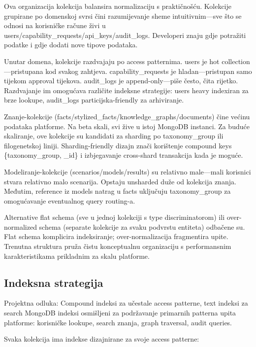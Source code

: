 \documentclass[12pt,a4paper]{article}
\begin{document}
Ova organizacija kolekcija balansira normalizaciju s praktičnošću. Kolekcije grupirane po domenskoj svrsi čini razumijevanje sheme intuitivnim—sve što se odnosi na korisničke račune živi u users/capability\_requests/api\_keys/audit\_logs. Developeri znaju gdje potražiti podatke i gdje dodati nove tipove podataka.

Unutar domena, kolekcije razdvajaju po access patternima. users je hot collection—pristupana kod svakog zahtjeva. capability\_requests je hladan—pristupan samo tijekom approval tijekova. audit\_logs je append-only—piše često, čita rijetko. Razdvajanje im omogućava različite indeksne strategije: users heavy indexiran za brze lookupe, audit\_logs particijska-friendly za arhiviranje.

Znanje-kolekcije (facts/stylized\_facts/knowledge\_graphs/documents) čine većinu podataka platforme. Na beta skali, svi žive u istoj MongoDB instanci. Za buduće skaliranje, ove kolekcije su kandidati za sharding po taxonomy\_group ili filogenetskoj liniji. Sharding-friendly dizajn znači korištenje compound keys \{taxonomy\_group, \_id\} i izbjegavanje cross-shard transakcija kada je moguće.

Modeliranje-kolekcije (scenarios/models/results) su relativno male—mali korisnici stvara relativno malo scenarija. Opstaju unsharded duže od kolekcija znanja. Međutim, reference iz models natrag u facts uključuju taxonomy\_group za omogućavanje eventualnog query routing-a.

Alternative flat schema (sve u jednoj kolekciji s type discriminatorom) ili over-normalized schema (separate kolekcije za svaku podvrstu entiteta) odbačene su. Flat schema komplicira indeksiranje; over-normalizacija fragmentira upite. Trenutna struktura pruža čistu konceptualnu organizaciju s performansnim karakteristikama prikladnim za skalu platforme.

\subsection{Indeksna strategija}

\begin{rationale}{Projektna odluka: Compound indeksi za učestale access patterne, text indeksi za search}
MongoDB indeksi osmišljeni za podržavanje primarnih patterna upita platforme: korisničke lookupe, search znanja, graph traversal, audit queries.
\end{rationale}

Svaka kolekcija ima indekse dizajnirane za svoje access patterne:
\end{document}
